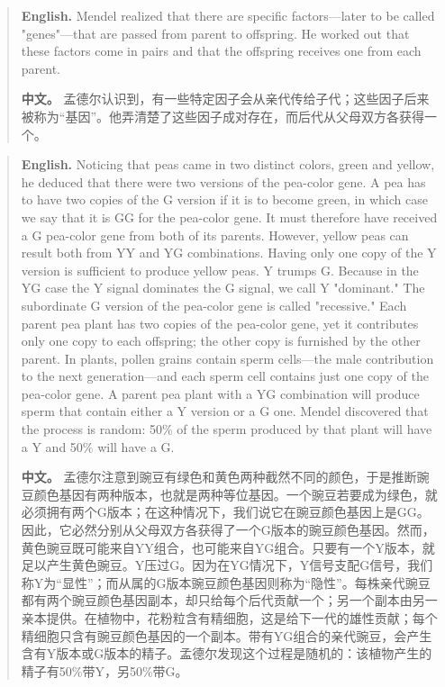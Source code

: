 \begin{quote}
\noindent\textbf{English.} Mendel realized that there are specific factors---later to be called "genes"---that are passed from parent to offspring. He worked out that these factors come in pairs and that the offspring receives one from each parent.

\smallskip
\noindent\textbf{中文。} 孟德尔认识到，有一些特定因子会从亲代传给子代；这些因子后来被称为“基因”。他弄清楚了这些因子成对存在，而后代从父母双方各获得一个。
\end{quote}

\begin{quote}
\noindent\textbf{English.} Noticing that peas came in two distinct colors, green and yellow, he deduced that there were two versions of the pea-color gene. A pea has to have two copies of the G version if it is to become green, in which case we say that it is GG for the pea-color gene. It must therefore have received a G pea-color gene from both of its parents. However, yellow peas can result both from YY and YG combinations. Having only one copy of the Y version is sufficient to produce yellow peas. Y trumps G. Because in the YG case the Y signal dominates the G signal, we call Y "dominant." The subordinate G version of the pea-color gene is called "recessive." Each parent pea plant has two copies of the pea-color gene, yet it contributes only one copy to each offspring; the other copy is furnished by the other parent. In plants, pollen grains contain sperm cells---the male contribution to the next generation---and each sperm cell contains just one copy of the pea-color gene. A parent pea plant with a YG combination will produce sperm that contain either a Y version or a G one. Mendel discovered that the process is random: 50\% of the sperm produced by that plant will have a Y and 50\% will have a G.

\smallskip
\noindent\textbf{中文。} 孟德尔注意到豌豆有绿色和黄色两种截然不同的颜色，于是推断豌豆颜色基因有两种版本，也就是两种等位基因。一个豌豆若要成为绿色，就必须拥有两个G版本；在这种情况下，我们说它在豌豆颜色基因上是GG。因此，它必然分别从父母双方各获得了一个G版本的豌豆颜色基因。然而，黄色豌豆既可能来自YY组合，也可能来自YG组合。只要有一个Y版本，就足以产生黄色豌豆。Y压过G。因为在YG情况下，Y信号支配G信号，我们称Y为“显性”；而从属的G版本豌豆颜色基因则称为“隐性”。每株亲代豌豆都有两个豌豆颜色基因副本，却只给每个后代贡献一个；另一个副本由另一亲本提供。在植物中，花粉粒含有精细胞，这是给下一代的雄性贡献；每个精细胞只含有豌豆颜色基因的一个副本。带有YG组合的亲代豌豆，会产生含有Y版本或G版本的精子。孟德尔发现这个过程是随机的：该植物产生的精子有50\%带Y，另50\%带G。
\end{quote}

